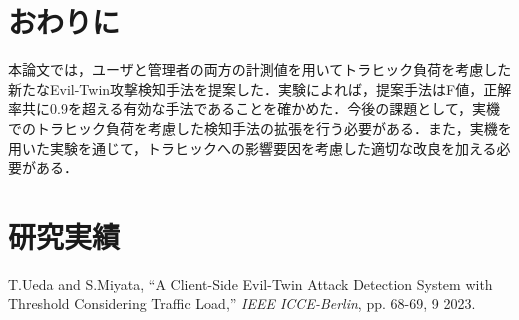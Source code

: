 \documentclass[twocolumn, a4paper]{ieicejsp}
\begin{document}
 \begin{table}[htbp]
 \centering
 \caption{検知結果} \label{tab:result}
\end{table}

\section{おわりに}
\small
本論文では，ユーザと管理者の両方の計測値を用いてトラヒック負荷を考慮した新たなEvil-Twin攻撃検知手法を提案した．実験によれば，提案手法はF値，正解率共に0.9を超える有効な手法であることを確かめた．今後の課題として，実機でのトラヒック負荷を考慮した検知手法の拡張を行う必要がある．また，実機を用いた実験を通じて，トラヒックへの影響要因を考慮した適切な改良を加える必要がある．
 



\section*{研究実績}
T.Ueda and S.Miyata, ``\rm{A Client-Side Evil-Twin Attack Detection System with Threshold Considering Traffic Load},'' \emph{IEEE ICCE-Berlin}, pp. 68-69, 9 2023.
\end{document}

